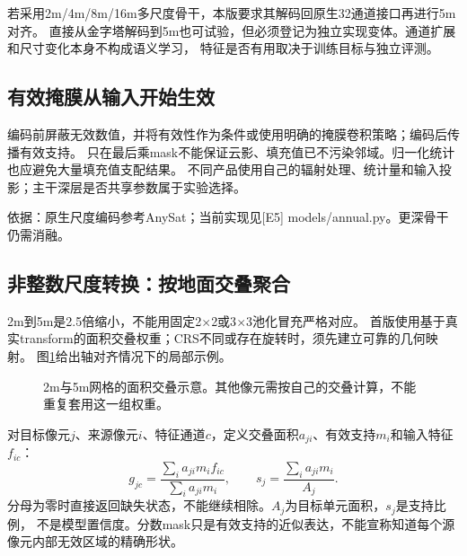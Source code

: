 \documentclass[UTF8,fontset=fandol,zihao=5,a4paper]{ctexart}
\newcommand{\source}[1]{\par{\footnotesize\color{muted}依据：#1}\par}
\newcommand{\reportpage}{\clearpage}
\begin{document}
若采用2m/4m/8m/16m多尺度骨干，本版要求其解码回原生32通道接口再进行5m对齐。
直接从金字塔解码到5m也可试验，但必须登记为独立实现变体。通道扩展和尺寸变化本身不构成语义学习，
特征是否有用取决于训练目标与独立评测。

\subsection{有效掩膜从输入开始生效}
编码前屏蔽无效数值，并将有效性作为条件或使用明确的掩膜卷积策略；编码后传播有效支持。
只在最后乘mask不能保证云影、填充值已不污染邻域。归一化统计也应避免大量填充值支配结果。
不同产品使用自己的辐射处理、统计量和输入投影；主干深层是否共享参数属于实验选择。
\source{原生尺度编码参考AnySat\cite{anysat}；当前实现见[E5] models/annual.py。更深骨干仍需消融。}

\reportpage
\subsection{非整数尺度转换：按地面交叠聚合}
\label{sec:resample}
2m到5m是2.5倍缩小，不能用固定2$\times$2或3$\times$3池化冒充严格对应。
首版使用基于真实transform的面积交叠权重；CRS不同或存在旋转时，须先建立可靠的几何映射。
图\ref{fig:overlap}给出轴对齐情况下的局部示例。

\begin{figure}[h]
\centering
{}
\caption{2m与5m网格的面积交叠示意。其他像元需按自己的交叠计算，不能重复套用这一组权重。}
\label{fig:overlap}
\end{figure}

对目标像元$j$、来源像元$i$、特征通道$c$，定义交叠面积$a_{ji}$、有效支持$m_i$和输入特征$f_{ic}$：
\begin{equation}
 g_{jc}=\frac{\sum_i a_{ji}m_i f_{ic}}{\sum_i a_{ji}m_i},\qquad
 s_j=\frac{\sum_i a_{ji}m_i}{A_j}.
\end{equation}
分母为零时直接返回缺失状态，不能继续相除。$A_j$为目标单元面积，$s_j$是支持比例，
不是模型置信度。分数mask只是有效支持的近似表达，不能宣称知道每个源像元内部无效区域的精确形状。
\end{document}
